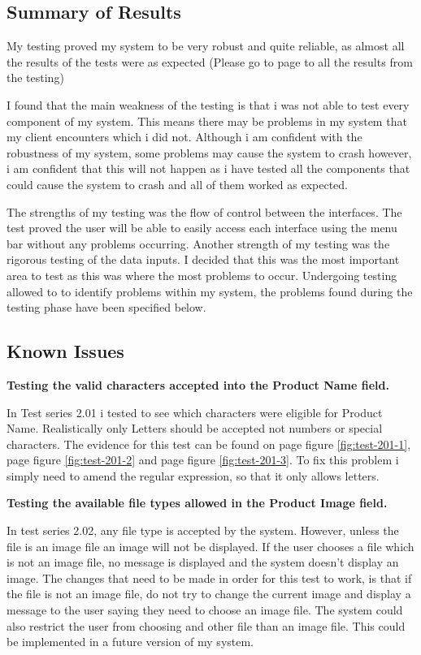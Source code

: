 \subsection{Summary of Results}

My testing proved my system to be very robust and quite reliable, as almost all the results of the tests were as expected (Please go to page \pageref{fig:actual-results} to all the results from the testing)

I found that the main weakness of the testing is that i was not able to test every component of my system. This means there may be problems in my system that my client encounters which i did not. Although i am confident with the robustness of my system, some problems may cause the system to crash however, i am confident that this will not happen as i have tested all the components that could cause the system to crash and all of them worked as expected.

The strengths of my testing was the flow of control between the interfaces. The test proved the user will be able to easily access each interface using the menu bar without any problems occurring. Another strength of my testing was the rigorous testing of the data inputs. I decided that this was the most important area to test as this was where the most problems to occur. Undergoing testing allowed to to identify problems within my system, the problems found during the testing phase have been specified below.

\subsection{Known Issues}

\textbf{Testing the valid characters accepted into the Product Name field.}

In Test series 2.01 i tested to see which characters were eligible for Product Name. Realistically only Letters should be accepted not numbers or special characters. The evidence for this test can be found on page \pageref{fig:test-201-1} figure \ref{fig:test-201-1}, page \pageref{fig:test-201-2} figure \ref{fig:test-201-2} and  page \pageref{fig:test-201-3} figure \ref{fig:test-201-3}. To fix this problem i simply need to amend the regular expression, so that it only allows letters. 



\textbf{Testing the available file types allowed in the Product Image field.}

In test series 2.02, any file type is accepted by the system. However, unless the file is an image file an image will not be displayed. If the user chooses a file which is not an image file, no message is displayed and the system doesn't display an image. The changes that need to be made in order for this test to work, is that if the file is not an image file, do not try to change the current image and display a message to the user saying they need to choose an image file. The system could also restrict the user from choosing and other file than an image file. This could be implemented in a future version of my system.

